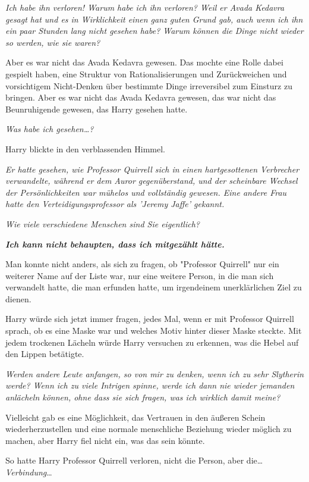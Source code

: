{\emph{Ich habe ihn verloren! Warum habe ich ihn verloren? Weil er Avada Kedavra gesagt hat und es in Wirklichkeit einen ganz guten Grund gab, auch wenn ich ihn ein paar Stunden lang nicht gesehen habe? Warum können die Dinge nicht wieder so werden, wie sie waren?}

Aber es war nicht das Avada Kedavra gewesen. Das mochte eine Rolle dabei gespielt haben, eine Struktur von Rationalisierungen und Zurückweichen und vorsichtigem Nicht-Denken über bestimmte Dinge irreversibel zum Einsturz zu bringen. Aber es war nicht das Avada Kedavra gewesen, das war nicht das Beunruhigende gewesen, das Harry gesehen hatte.

\emph{Was habe ich gesehen…?}

Harry blickte in den verblassenden Himmel.

\emph{Er hatte gesehen, wie Professor Quirrell sich in einen hartgesottenen Verbrecher verwandelte, während er dem Auror gegenüberstand, und der scheinbare Wechsel der Persönlichkeiten war mühelos und vollständig gewesen. Eine andere Frau hatte den Verteidigungsprofessor als 'Jeremy Jaffe' gekannt.}

\emph{Wie viele verschiedene Menschen sind Sie eigentlich?}

\emph{\textbf{Ich kann nicht behaupten, dass ich mitgezählt hätte.}}

Man konnte nicht anders, als sich zu fragen, ob "Professor Quirrell" nur ein weiterer Name auf der Liste war, nur eine weitere Person, in die man sich verwandelt hatte, die man erfunden hatte, um irgendeinem unerklärlichen Ziel zu dienen.

Harry würde sich jetzt immer fragen, jedes Mal, wenn er mit Professor Quirrell sprach, ob es eine Maske war und welches Motiv hinter dieser Maske steckte. Mit jedem trockenen Lächeln würde Harry versuchen zu erkennen, was die Hebel auf den Lippen betätigte.

\emph{Werden andere Leute anfangen, so von mir zu denken, wenn ich zu sehr Slytherin werde? Wenn ich zu viele Intrigen spinne, werde ich dann nie wieder jemanden anlächeln können, ohne dass sie sich fragen, was ich wirklich damit meine?}

Vielleicht gab es eine Möglichkeit, das Vertrauen in den äußeren Schein wiederherzustellen und eine normale menschliche Beziehung wieder möglich zu machen, aber Harry fiel nicht ein, was das sein könnte.

So hatte Harry Professor Quirrell verloren, nicht die Person, aber die… \emph{Verbindung}…

}
